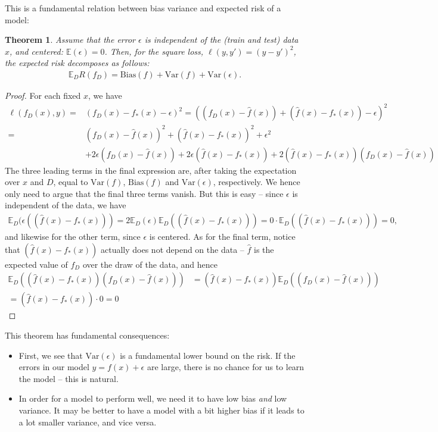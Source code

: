 \documentclass{article}
\newcommand{\erw}{\mathbb{E}} %
\newtheorem{theorem}{Theorem}
\begin{document}
This is a fundamental relation between bias variance and expected risk of a model:
\begin{theorem}
    Assume that the error $\epsilon$ is independent of the (train and test) data $x$, and centered: $\erw(\epsilon)=0$. Then, for the square loss, $\ell(y,y')=(y-y')^2$, the expected risk decomposes as follows:
    \begin{align*}
        \erw_D R(f_D) = \mathrm{Bias}(f) + \mathrm{Var}(f) + \mathrm{Var}(\epsilon).
    \end{align*}
\end{theorem}
\begin{proof}
    For each fixed $x$, we have
    \begin{align*}
        \ell(f_D(x),y) =& (f_D(x)-f_*(x)-\epsilon)^2 = \left((f_D(x) - \widehat{f}(x)) + (\widehat{f}(x)-f_*(x)) -\epsilon\right)^2 \\
        =& (f_D(x)-\widehat{f}(x))^2 + (\widehat{f}(x)- f_*(x))^2 +\epsilon^2 \\
        & +2 \epsilon (f_D(x)-\widehat{f}(x)) + 2\epsilon (\widehat{f}(x)- f_*(x)) + 2(\widehat{f}(x)- f_*(x))(f_D(x)-\widehat{f}(x))
    \end{align*}
    The three leading terms in the final expression are, after taking the expectation over $x$ and $D$, equal to $\mathrm{Var}(f)$, $\mathrm{Bias}(f)$ and $\mathrm{Var}(\epsilon)$, respectively. We hence only need to argue that the final three terms vanish. But this is easy -- since $\epsilon$ is independent of the data, we have
    \begin{align*}
        \erw_D(\epsilon ((\widehat{f}(x)- f_*(x))) = 2\erw_D(\epsilon) \erw_D((\widehat{f}(x)- f_*(x))) = 0 \cdot  \erw_D((\widehat{f}(x)- f_*(x))) =0,
    \end{align*}
    and likewise for the other term, since $\epsilon$ is centered. As for the final term, notice that $(\widehat{f}(x)- f_*(x))$ actually does not depend on the data -- $\widehat{f}$ is the expected value of $f_D$ over the draw of the data, and hence
    \begin{align*}
        \erw_D((\widehat{f}(x)- f_*(x))(f_D(x)-\widehat{f}(x)))& = (\widehat{f}(x)- f_*(x))\erw_D((f_D(x)-\widehat{f}(x))) \\= (\widehat{f}(x)- f_*(x))\cdot 0 = 0 
    \end{align*}
\end{proof}
This theorem has fundamental consequences:
\begin{itemize}
    \item First, we see that $\mathrm{Var}(\epsilon)$ is a fundamental lower bound on the risk. If the errors in our model $y=f(x)+\epsilon$ are large, there is no chance for us to learn the model -- this is natural.
    \item In order for a model to perform well, we need it to have low bias \emph{and} low variance. It may be better to have a model with a bit higher bias if it leads to a lot smaller variance, and vice versa.
\end{itemize}
\end{document}
